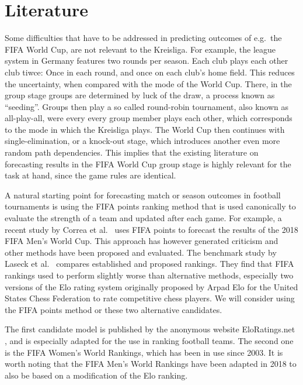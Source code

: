 \documentclass[12pt,a4paper]{article}
\begin{document}
\hypertarget{literature}{%
\section{Literature}\label{literature}}

Some difficulties that have to be addressed in predicting outcomes of
e.g.~the FIFA World Cup, are not relevant to the Kreisliga. For example,
the league system in Germany features two rounds per season. Each club
plays each other club tiwce: Once in each round, and once on each club's
home field. This reduces the uncertainty, when compared with the mode of
the World Cup. There, in the group stage groups are determined by luck
of the draw, a process known as \enquote{seeding}. Groups then play a so
called round-robin tournament, also known as all-play-all, were every
every group member plays each other, which corresponds to the mode in
which the Kreisliga plays. The World Cup then continues with
single-elimination, or a knock-out stage, which introduces another even
more random path dependencies. This implies that the existing literature
on forecasting results in the FIFA World Cup group stage is highly
relevant for the task at hand, since the game rules are identical.

A natural starting point for forecasting match or season outcomes in
football tournaments is using the FIFA points ranking method that is
used canonically to evaluate the strength of a team and updated after
each game. For example, a recent study by Correa et
al.~\autocite*{correa} uses FIFA points to forecast the results of the
2018 FIFA Men's World Cup. This approach has however generated criticism
and other methods have been proposed and evaluated. The benchmark study
by Laseck et al.~\autocite*{lasek2013} compares established and proposed
rankings. They find that FIFA rankings used to perform slightly worse
than alternative methods, especially two versions of the Elo rating
system originally proposed by Arpad Elo for the United States Chess
Federation to rate competitive chess players. We will consider using the
FIFA points method or these two alternative candidates.

The first candidate model is published by the anonymous website
EloRatings.net \autocite*{eloratings}, and is especially adapted for the
use in ranking football teams. The second one is the FIFA Women's World
Rankings, which has been in use since 2003. It is worth noting that the
FIFA Men's World Rankings have been adapted in 2018 to also be based on
a modification of the Elo ranking.
\end{document}
